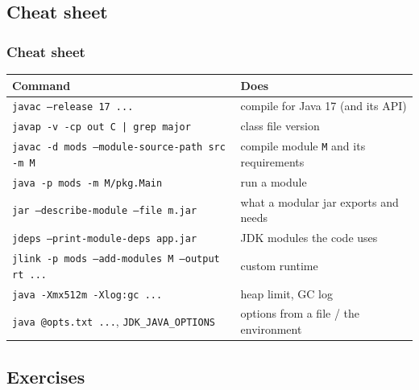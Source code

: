 \documentclass[aspectratio=169,10pt,compress]{beamer}
\begin{document}

\subsection[Cheat sheet]{Cheat sheet}




\begin{frame}[t,fragile] \frametitle{Cheat sheet}
  \footnotesize
  \begin{tabular}{@{}L{0.56\textwidth}L{0.36\textwidth}@{}}
    \toprule
    \textbf{Command} & \textbf{Does} \\
    \midrule
    \texttt{javac --release 17 ...}                                & compile for Java 17 (and its API) \\
    \texttt{javap -v -cp out C | grep major}                       & class file version \\
    \texttt{javac -d mods --module-source-path src -m M}           & compile module \texttt{M} and its requirements \\
    \texttt{java -p mods -m M/pkg.Main}                            & run a module \\
    \texttt{jar --describe-module --file m.jar}                    & what a modular jar exports and needs \\
    \texttt{jdeps --print-module-deps app.jar}                     & JDK modules the code uses \\
    \texttt{jlink -p mods --add-modules M --output rt ...}         & custom runtime \\
    \texttt{java -Xmx512m -Xlog:gc ...}                            & heap limit, GC log \\
    \texttt{java @opts.txt ...}, \texttt{JDK\_JAVA\_OPTIONS}       & options from a file / the environment \\
    \bottomrule
  \end{tabular}
\end{frame}

\subsection[Exercises]{Exercises}
\end{document}
